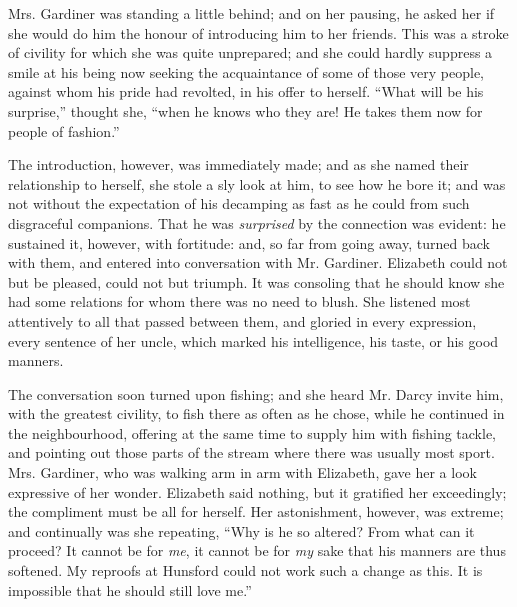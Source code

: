 Mrs. Gardiner was standing a little behind; and on her pausing, he asked her if she would do him the honour of introducing him to her friends. This was a stroke of civility for which she was quite unprepared; and she could hardly suppress a smile at his being now seeking the acquaintance of some of those very people, against whom his pride had revolted, in his offer to herself. ``What will be his surprise,'' thought she, ``when he knows who they are! He takes them now for people of fashion.''

The introduction, however, was immediately made; and as she named their relationship to herself, she stole a sly look at him, to see how he bore it; and was not without the expectation of his decamping as fast as he could from such disgraceful companions. That he was \textit{surprised} by the connection was evident: he sustained it, however, with fortitude: and, so far from going away, turned back with them, and entered into conversation with Mr. Gardiner. Elizabeth could not but be pleased, could not but triumph. It was consoling that he should know she had some relations for whom there was no need to blush. She listened most attentively to all that passed between them, and gloried in every expression, every sentence of her uncle, which marked his intelligence, his taste, or his good manners.

The conversation soon turned upon fishing; and she heard Mr. Darcy invite him, with the greatest civility, to fish there as often as he chose, while he continued in the neighbourhood, offering at the same time to supply him with fishing tackle, and pointing out those parts of the stream where there was usually most sport. Mrs. Gardiner, who was walking arm in arm with Elizabeth, gave her a look expressive of her wonder. Elizabeth said nothing, but it gratified her exceedingly; the compliment must be all for herself. Her astonishment, however, was extreme; and continually was she repeating, ``Why is he so altered? From what can it proceed? It cannot be for \textit{me}, it cannot be for \textit{my} sake that his manners are thus softened. My reproofs at Hunsford could not work such a change as this. It is impossible that he should still love me.''

